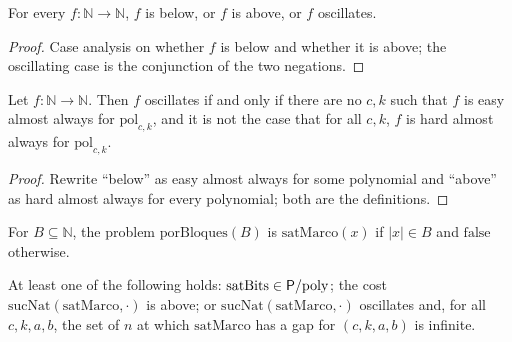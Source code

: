 \begin{theorem}
  \label{thm:infinite-tricotomia}
  \leanok
  \own{}
  For every $f : \mathbb{N} \to \mathbb{N}$, $f$ is below, or $f$ is above, or $f$ oscillates.
\end{theorem}

\begin{proof}
  \leanok
  Case analysis on whether $f$ is below and whether it is above; the oscillating case is the conjunction of the two
  negations.
\end{proof}

\begin{theorem}
  \label{thm:infinite-oscila-iff-ni-ni}
  \leanok
  \own{}
  Let $f : \mathbb{N} \to \mathbb{N}$. Then $f$ oscillates if and only if there are no $c, k$ such that $f$ is easy
  almost always for $\mathrm{pol}_{c,k}$, and it is not the case that for all $c, k$, $f$ is hard almost always for
  $\mathrm{pol}_{c,k}$.
\end{theorem}

\begin{proof}
  \leanok
  Rewrite ``below'' as easy almost always for some polynomial and ``above'' as hard almost always for every polynomial;
  both are the definitions.
\end{proof}

\begin{definition}
  \label{def:infinite-por-bloques}
  \leanok
  \own{}
  For $B \subseteq \mathbb{N}$, the problem $\mathrm{porBloques}(B)$ is $\mathrm{satMarco}(x)$ if $|x| \in B$ and
  $\mathrm{false}$ otherwise.
\end{definition}

\begin{theorem}
  \label{thm:infinite-tricotomia-sat}
  \leanok
  \own{}
  At least one of the following holds: $\mathrm{satBits} \in \mathsf{P}/\mathrm{poly}$; the cost $\mathrm{sucNat}(\mathrm{satMarco}, \cdot)$ is
  above; or $\mathrm{sucNat}(\mathrm{satMarco}, \cdot)$ oscillates and, for all $c, k, a, b$, the set of $n$ at which
  $\mathrm{satMarco}$ has a gap for $(c, k, a, b)$ is infinite.
\end{theorem}

